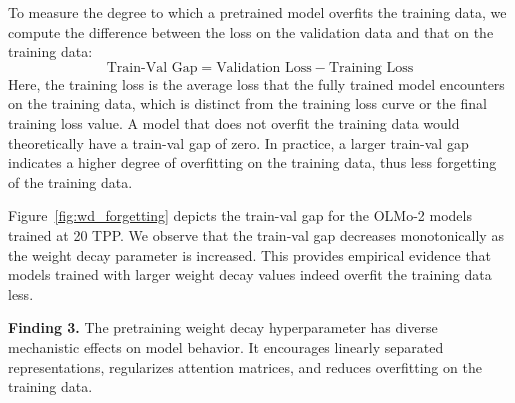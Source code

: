 To measure the degree to which a pretrained model overfits the training data, we compute the difference between the loss on the validation data and that on the training data:
\begin{equation}
\label{eq:train-val-gap}
    \text{Train-Val Gap} = \text{Validation Loss} - \text{Training Loss}
\end{equation}
Here, the training loss is the average loss that the fully trained model encounters on the training data, which is distinct from the training loss curve or the final training loss value. A model that does not overfit the training data would theoretically have a train-val gap of zero. In practice, a larger train-val gap indicates a higher degree of overfitting on the training data, thus less forgetting of the training data.

Figure~\ref{fig:wd_forgetting} depicts the train-val gap for the OLMo-2 models trained at 20 TPP. We observe that the train-val gap decreases monotonically as the weight decay parameter is increased. This provides empirical evidence that models trained with larger weight decay values indeed overfit the training data less.


\begin{finding}
\textbf{Finding 3.} The pretraining weight decay hyperparameter has diverse mechanistic effects on model behavior. It encourages linearly separated representations, regularizes attention matrices, and reduces overfitting on the training data. 
\end{finding}















